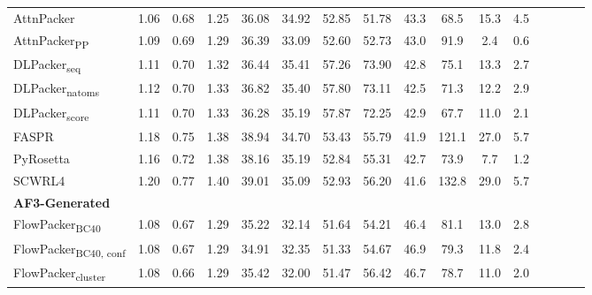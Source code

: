 \begin{table}
{\begin{tabular}{@{}lccccccccccccccc@{}}
                \textnormal{\hspace{0.5cm}AttnPacker} & 1.06 & 0.68 & 1.25 & 36.08 & 34.92 & 52.85 & 51.78 & 43.3 & 68.5 & 15.3 & 4.5 \\
                \textnormal{\hspace{0.5cm}AttnPacker\textsubscript{PP}} & 1.09 & 0.69 & 1.29 & 36.39 & 33.09 & 52.60 & 52.73 & 43.0 & 91.9 & 2.4 & 0.6 \\
                \textnormal{\hspace{0.5cm}DLPacker\textsubscript{seq}} & 1.11 & 0.70 & 1.32 & 36.44 & 35.41 & 57.26 & 73.90 & 42.8 & 75.1 & 13.3 & 2.7 \\
                \textnormal{\hspace{0.5cm}DLPacker\textsubscript{natoms}} & 1.12 & 0.70 & 1.33 & 36.82 & 35.40 & 57.80 & 73.11 & 42.5 & 71.3 & 12.2 & 2.9 \\
                \textnormal{\hspace{0.5cm}DLPacker\textsubscript{score}} & 1.11 & 0.70 & 1.33 & 36.28 & 35.19 & 57.87 & 72.25 & 42.9 & 67.7 & 11.0 & 2.1 \\
                \textnormal{\hspace{0.5cm}FASPR} & 1.18 & 0.75 & 1.38 & 38.94 & 34.70 & 53.43 & 55.79 & 41.9 & 121.1 & 27.0 & 5.7 \\
                \textnormal{\hspace{0.5cm}PyRosetta} & 1.16 & 0.72 & 1.38 & 38.16 & 35.19 & 52.84 & 55.31 & 42.7 & 73.9 & 7.7 & 1.2 \\
                \textnormal{\hspace{0.5cm}SCWRL4} & 1.20 & 0.77 & 1.40 & 39.01 & 35.09 & 52.93 & 56.20 & 41.6 & 132.8 & 29.0 & 5.7 \\
            \textbf{AF3-Generated} & & & & & & & & & \\ 
                \textnormal{\hspace{0.5cm}FlowPacker\textsubscript{BC40}} & 1.08 & 0.67 & 1.29 & 35.22 & 32.14 & 51.64 & 54.21 & 46.4 & 81.1 & 13.0 & 2.8 \\
                \textnormal{\hspace{0.5cm}FlowPacker\textsubscript{BC40, conf}} & 1.08 & 0.67 & 1.29 & 34.91 & 32.35 & 51.33 & 54.67 & 46.9 & 79.3 & 11.8 & 2.4 \\
                \textnormal{\hspace{0.5cm}FlowPacker\textsubscript{cluster}} & 1.08 & 0.66 & 1.29 & 35.42 & 32.00 & 51.47 & 56.42 & 46.7 & 78.7 & 11.0 & 2.0 \\

\end{tabular}}
\end{table}
